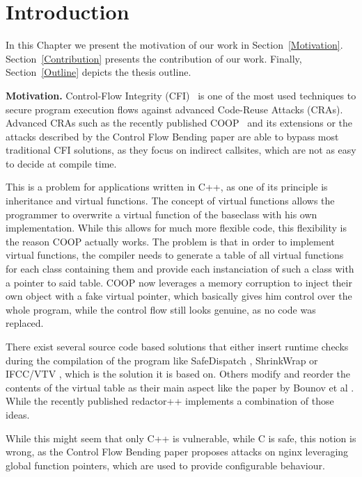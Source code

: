 \section{Introduction}
\label{chapter:Introduction}
In this Chapter we present the motivation of our work in Section~\ref{Motivation}.
Section~\ref{Contribution} presents the contribution of our work.
Finally, Section~\ref{Outline} depicts the thesis outline.

\textbf{Motivation.}
\label{Motivation}
Control-Flow Integrity (CFI)~\cite{abadi:cfi2, abadi:cfi} is one of the most used techniques to secure program execution flows against advanced Code-Reuse Attacks (CRAs).
Advanced CRAs such as the recently published COOP~\cite{schuster:coop} and its extensions \cite{crane:readactor++} or the attacks described by the Control Flow Bending paper \cite{carlini:bending} are able to bypass most traditional CFI solutions, as they focus on indirect callsites, which are not as easy to decide at compile time.

This is a problem for applications written in C++, as one of its principle is inheritance and virtual functions. The concept of virtual functions allows the programmer to overwrite a virtual function of the baseclass with his own implementation. While this allows for much more flexible code, this flexibility is the reason COOP actually works. The problem is that in order to implement virtual functions, the compiler needs to generate a table of all virtual functions for each class containing them and provide each instanciation of such a class with a pointer to said table. COOP now leverages a memory corruption to inject their own object with a fake virtual pointer, which basically gives him control over the whole program, while the control flow still looks genuine, as no code was replaced. 

There exist several source code based solutions that either insert runtime checks during the compilation of the program like SafeDispatch \cite{safedispatch:jang}, ShrinkWrap \cite{haller:shrinkwrap} or IFCC/VTV \cite{vtv:tice}, which is the solution it is based on. Others modify and reorder the contents of the virtual table as their main aspect like the paper by Bounov et al \cite{bounov:interleaving}. While the recently published redactor++ \cite{crane:readactor++} implements a combination of those ideas.

While this might seem that only C++ is vulnerable, while C is safe, this notion is wrong, as the Control Flow Bending paper \cite{carlini:bending} proposes attacks on nginx leveraging global function pointers, which are used to provide configurable behaviour.

